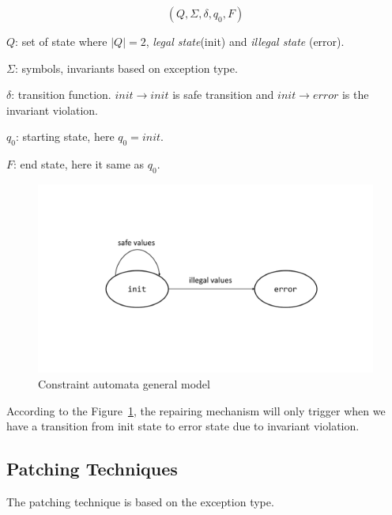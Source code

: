 $$(Q, \Sigma, \delta, q_0, F)$$
\begin{mybullet}
 \item $Q$: set of state where $|Q| = 2$, \emph{legal state}(init) and
\emph{illegal state} (error).
 \item $\Sigma$: symbols, invariants based on exception type.
 \item $\delta$: transition function. $init \rightarrow init$ is safe
transition and $init \rightarrow error$ is the invariant violation.
 \item $q_0$: starting state, here $q_0 = init$.
 \item $F$: end state, here it same as $q_0$.
\end{mybullet}

\begin{figure}[t]
\centering
\includegraphics[scale=.25]{images/automata.pdf}
\caption{Constraint automata general model}
\label{fig:automata}
\end{figure}

According to the Figure~\ref{fig:automata}, the repairing mechanism will only
trigger when we have a transition from 
init state to error state due to invariant violation.

\subsection{Patching Techniques}
\label{subsec:patchCA}

The patching technique is based on the exception type. 
